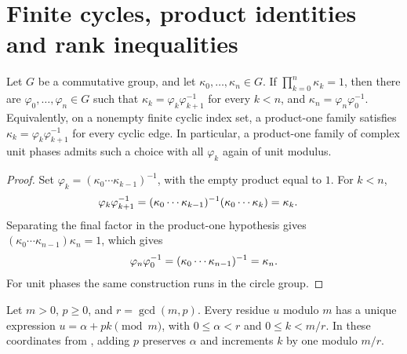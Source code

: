 \section{Finite cycles, product identities and rank inequalities}

\begin{lemma}
    \label{lem:finite_cycle_coboundary}
    \leanok
    Let $G$ be a commutative group, and let
    $\kappa_0,\ldots,\kappa_n\in G$. If
    $\prod_{k=0}^{n}\kappa_k=1$, then there are
    $\varphi_0,\ldots,\varphi_n\in G$ such that
    $\kappa_k=\varphi_k\varphi_{k+1}^{-1}$ for every $k<n$, and
    $\kappa_n=\varphi_n\varphi_0^{-1}$.
    Equivalently, on a nonempty finite cyclic index set, a product-one family
    satisfies $\kappa_k=\varphi_k\varphi_{k+1}^{-1}$ for every cyclic edge.
    In particular, a product-one family of complex unit phases admits such a
    choice with all $\varphi_k$ again of unit modulus.
\end{lemma}

\begin{proof}
    \leanok
    Set $\varphi_k=(\kappa_0\cdots\kappa_{k-1})^{-1}$, with the empty product
    equal to $1$. For $k<n$,
    \begin{align}
        \varphi_k\varphi_{k+1}^{-1}
         & =
        (\kappa_0\cdots\kappa_{k-1})^{-1}
        (\kappa_0\cdots\kappa_k)
        =\kappa_k. \notag
    \end{align}
    Separating the final factor in the product-one hypothesis gives
    $(\kappa_0\cdots\kappa_{n-1})\kappa_n=1$, which gives
    \begin{align}
        \varphi_n\varphi_0^{-1}
        =
        (\kappa_0\cdots\kappa_{n-1})^{-1}
        =
        \kappa_n. \notag
    \end{align}
    For unit phases the same construction runs in the circle group.
\end{proof}

\begin{lemma}
    \label{thm:periodic_step_coordinates}
    \leanok
    Let $m>0$, $p\geq0$, and $r=\gcd(m,p)$. Every residue $u$ modulo $m$
    has a unique expression $u=\alpha+pk\pmod m$, with
    $0\leq\alpha<r$ and $0\leq k<m/r$.
    In these coordinates from
    \cite[proof of Theorem~4.1]{DeLasCuevas2017Irreducible}, adding $p$
    preserves $\alpha$ and increments $k$ by one modulo $m/r$.
\end{lemma}

